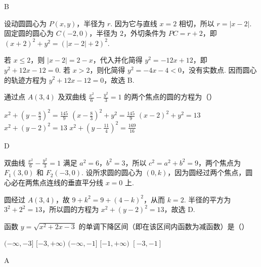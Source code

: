 \documentclass[UTF8,a4paper,oneside,11pt]{ctexbook}
\begin{document}
\begin{answer}
B
\end{answer}

\begin{solution}
设动圆圆心为 \(P(x,y)\)，半径为 \(r\). 因为它与直线 \(x=2\) 相切，所以 \(r=|x-2|\). 固定圆的圆心为 \(C(-2,0)\)，半径为 \(2\)，外切条件为
\(PC=r+2\)，即
\((x+2)^2+y^2=(|x-2|+2)^2\).

若 \(x\leq2\)，则 \(|x-2|=2-x\)，代入并化简得 \(y^2=-12x+12\)，即 \(y^2+12x-12=0\). 若 \(x>2\)，则化简得 \(y^2=-4x-4<0\)，没有实数点. 因而圆心的轨迹方程为 \(y^2+12x-12=0\)，故选 B.
\end{solution}

\begin{problem}

通过点 \(A(3,4) \) 及双曲线 \(\frac{x^{2}}{6}-\frac{y^{2}}{3}=1 \) 的两个焦点的圆的方程为（\quad）

\choicesfive
    {\(x^{2}+\left(y-\frac{8}{3}\right)^{2}=\frac{145}{9} \)}
    {\(\left(x-\frac{8}{3}\right)^{2}+y^{2}=\frac{145}{9} \)}
    {\((x-2)^{2}+y^{2}=13 \)}
    {\(x^{2}+(y-2)^{2}=13 \)}
    {\(x^{2}+\left(y-\frac{11}{4}\right)^{2}=\frac{169}{16}\)}
\end{problem}

\begin{answer}
D
\end{answer}

\begin{solution}
双曲线 \(\frac{x^2}{6}-\frac{y^2}{3}=1\) 满足 \(a^2=6\)，\(b^2=3\)，所以 \(c^2=a^2+b^2=9\)，两个焦点为 \(F_1(3,0)\) 和 \(F_2(-3,0)\). 设所求圆的圆心为 \((0,k)\)，因为圆经过两个焦点，圆心必在两焦点连线的垂直平分线 \(x=0\) 上.

圆经过 \(A(3,4)\)，故
\(9+k^2=9+(4-k)^2\)，从而 \(k=2\). 半径的平方为 \(3^2+2^2=13\)，所以圆的方程为 \(x^2+(y-2)^2=13\)，故选 D.
\end{solution}

\begin{problem}

函数 \(y = \sqrt{x^2 + 2x - 3} \) 的单调下降区间（即在该区间内函数为减函数）是（\quad）

\choicesfive
    {\((-\infty, -3] \)}
    {\([-3, +\infty) \)}
    {\((-\infty, -1] \)}
    {\([-1, +\infty) \)}
    {\([-3, -1] \)}
\end{problem}

\begin{answer}
A
\end{answer}
\end{document}
